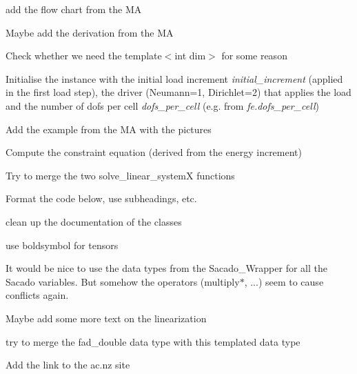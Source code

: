 
\begin{DoxyRefList}
\item[\label{todo__todo000001}%
\hypertarget{todo__todo000001}{}%
page \hyperlink{index}{Hybrid solution method with dissipation energy-\/based arc-\/length method} ]add the flow chart from the MA 

Maybe add the derivation from the MA 

Check whether we need the template$<$int dim$>$ for some reason
\begin{DoxyItemize}
\item Initialise the instance with the initial load increment {\itshape initial\+\_\+increment} (applied in the first load step), the driver (Neumann=1, Dirichlet=2) that applies the load and the number of dofs per cell {\itshape dofs\+\_\+per\+\_\+cell} (e.\+g. from {\itshape fe.\+dofs\+\_\+per\+\_\+cell}) 
\end{DoxyItemize}

Add the example from the MA with the pictures
\begin{DoxyItemize}
\item Compute the constraint equation (derived from the energy increment) 
\end{DoxyItemize}

Try to merge the two solve\+\_\+linear\+\_\+systemX functions

Format the code below, use subheadings, etc.

clean up the documentation of the classes

use boldsymbol for tensors

It would be nice to use the data types from the Sacado\+\_\+\+Wrapper for all the Sacado variables. But somehow the operators (multiply$\ast$, ...) seem to cause conflicts again.

Maybe add some more text on the linearization 

try to merge the fad\+\_\+double data type with this templated data type 

Add the link to the ac.\+nz site
\end{DoxyRefList}